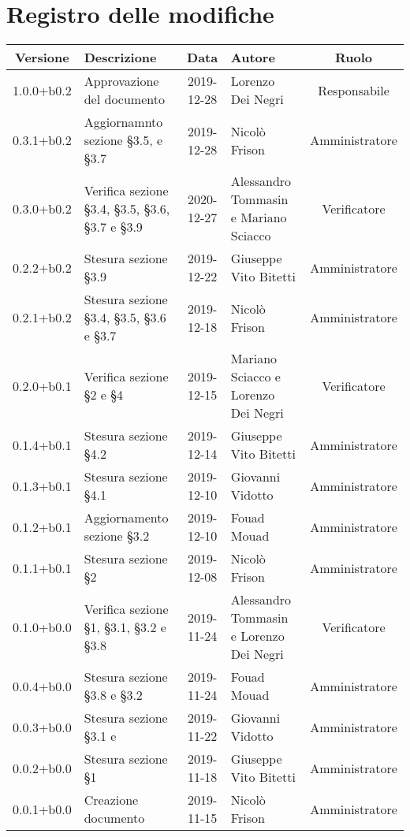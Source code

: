 \section*{Registro delle modifiche}

\begin{center}
	\begin{longtable}{|c|p{3cm}|c|p{4cm}|c|}
	\hline
	\rowcolor{lighter-grayer}
	\textbf{Versione} & \textbf{Descrizione} & \textbf{Data} & \textbf{Autore} & \textbf{Ruolo} \\
	\hline
	\endfirsthead



	\hline
	1.0.0+b0.2 & Approvazione del documento & 2019-12-28 & Lorenzo Dei Negri & Responsabile \\
	\hline
	0.3.1+b0.2 & Aggiornamnto sezione  \S3.5, e \S3.7 & 2019-12-28 & Nicolò Frison & Amministratore \\
	\hline 
	0.3.0+b0.2 & Verifica sezione \S3.4, \S3.5, \S3.6, \S3.7 e \S3.9 & 2020-12-27 & Alessandro Tommasin e Mariano Sciacco & Verificatore\\
	\hline
	0.2.2+b0.2 & Stesura sezione \S3.9 & 2019-12-22 & Giuseppe Vito Bitetti & Amministratore \\
	\hline
	0.2.1+b0.2 & Stesura sezione \S3.4, \S3.5, \S3.6 e \S3.7 & 2019-12-18 & Nicolò Frison & Amministratore \\
	\hline
	0.2.0+b0.1 & Verifica sezione \S2 e \S4 & 2019-12-15 & Mariano Sciacco e Lorenzo Dei Negri & Verificatore \\
	\hline
	0.1.4+b0.1 & Stesura sezione \S4.2 & 2019-12-14 & Giuseppe Vito Bitetti & Amministratore \\
	\hline
	0.1.3+b0.1 & Stesura sezione \S4.1 & 2019-12-10 & Giovanni Vidotto & Amministratore \\
	\hline
	0.1.2+b0.1 & Aggiornamento sezione \S3.2 & 2019-12-10 & Fouad Mouad & Amministratore \\
	\hline
	0.1.1+b0.1 & Stesura sezione \S2  & 2019-12-08 & Nicolò Frison & Amministratore \\
	\hline
	0.1.0+b0.0 & Verifica sezione \S1, \S3.1, \S3.2 e \S3.8 & 2019-11-24 & Alessandro Tommasin e Lorenzo Dei Negri & Verificatore \\
	\hline
	0.0.4+b0.0 & Stesura sezione \S3.8 e \S3.2 & 2019-11-24 & Fouad Mouad & Amministratore \\
	\hline
	0.0.3+b0.0 & Stesura sezione \S3.1 e & 2019-11-22 & Giovanni Vidotto & Amministratore \\
	\hline
	0.0.2+b0.0 & Stesura sezione \S1 & 2019-11-18 & Giuseppe Vito Bitetti & Amministratore \\
	\hline
	0.0.1+b0.0 & Creazione documento & 2019-11-15 & Nicolò Frison & Amministratore  \\
	\hline

	\end{longtable}
\end{center}
